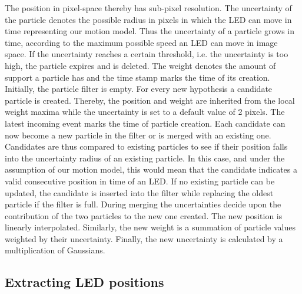 The position in pixel-space thereby has sub-pixel resolution. The uncertainty of the particle denotes the possible radius in pixels in which the LED can move in time representing our motion model. Thus the uncertainty of a particle grows in time, according to the maximum possible speed an LED can move in image space. If the uncertainty reaches a certain threshold, i.e. the uncertainty is too high, the particle expires and is deleted. The weight denotes the amount of support a particle has and the time stamp marks the time of its creation.\\

Initially, the particle filter is empty. For every new hypothesis a candidate particle is created. Thereby, the position and weight are inherited from the local weight maxima while the uncertainty is set to a default value of 2 pixels. The latest incoming event marks the time of particle creation.  Each candidate can now become a new particle in the filter or is merged with an existing one. Candidates are thus compared to existing particles to see if their position falls into the uncertainty radius of an existing particle. In this case, and under the assumption of our motion model, this would mean that the candidate indicates a valid consecutive position in time of an LED. If no existing particle can be updated, the candidate is inserted into the filter while replacing the oldest particle if the filter is full.
During merging the uncertainties decide upon the contribution of the two particles to the new one created. The new position is linearly interpolated. Similarly, the new weight is a summation of particle values weighted by their uncertainty. Finally, the new uncertainty is calculated by a multiplication of Gaussians.

\subsection{Extracting LED positions}\label{sec:ledpositions}


